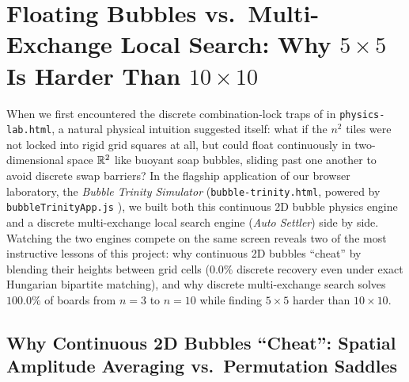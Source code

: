 \section{Floating Bubbles vs.\ Multi-Exchange Local Search: Why \texorpdfstring{$5\times 5$}{5x5} Is Harder Than \texorpdfstring{$10\times 10$}{10x10}}
\label{sec:bubble}

When we first encountered the discrete combination-lock traps of  in \texttt{physics-lab.html}, a natural physical intuition suggested itself: what if the $n^2$ tiles were not locked into rigid grid squares at all, but could float continuously in two-dimensional space $\mathbb{R}^2$ like buoyant soap bubbles, sliding past one another to avoid discrete swap barriers? In the flagship application of our browser laboratory, the \emph{Bubble Trinity Simulator} (\texttt{bubble-trinity.html}, powered by \texttt{bubbleTrinityApp.js} \cite{mathewson2026physicalsolver}), we built both this continuous 2D bubble physics engine and a discrete multi-exchange local search engine (\emph{Auto Settler}) side by side. Watching the two engines compete on the same screen reveals two of the most instructive lessons of this project: why continuous 2D bubbles ``cheat'' by blending their heights between grid cells ($0.0\%$ discrete recovery even under exact Hungarian bipartite matching), and why discrete multi-exchange search solves $100.0\%$ of boards from $n=3$ to $n=10$ while finding $5\times 5$ harder than $10\times 10$.

\subsection{Why Continuous 2D Bubbles ``Cheat'': Spatial Amplitude Averaging vs.\ Permutation Saddles}

